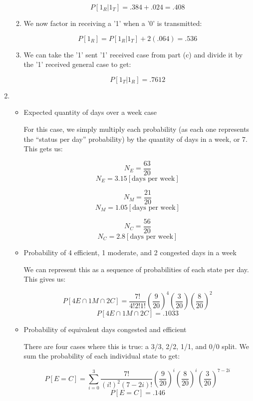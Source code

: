 \begin{enumerate}
\begin{enumerate}
        $$\boxed{P[1_R|1_T]=.384+.024=.408}$$

      \item We now factor in receiving a '1' when a '0' is transmitted:

        $$\boxed{P[1_R]=P[1_R|1_T] + 2(.064)=.536}$$

      \item We can take the '1' sent '1' received case from part (c) and divide it by the '1' received general case to get:

        $$\boxed{P[1_T|1_R]=.7612}$$

    \end{enumerate}

  \item

    \begin{itemize}

      \item Expected quantity of days over a week case

        For this case, we simply multiply each probability (as each one represents the ``status per day'' probability) by the quantity of days in a week, or 7. This gets us:

        $$N_E=\frac{63}{20}$$
        $$\boxed{N_E=3.15[\text{days per week}]}$$

        $$N_M=\frac{21}{20}$$
        $$\boxed{N_M=1.05[\text{days per week}]}$$

        $$N_C=\frac{56}{20}$$
        $$\boxed{N_C=2.8[\text{days per week}]}$$

      \item Probability of 4 efficient, 1 moderate, and 2 congested days in a week

        We can represent this as a sequence of probabilities of each state per day. This gives us:

        $$P[4E \cap 1M\cap 2C]=\frac{7!}{4!2!1!}\left( \frac{9}{20} \right)^4\left( \frac{3}{20} \right)\left( \frac{8}{20} \right)^2$$
        $$\boxed{P[4E \cap 1M\cap 2C]=.1033}$$

      \item Probability of equivalent days congested and efficient

        There are four cases where this is true: a 3/3, 2/2, 1/1, and 0/0 split. We sum the probability of each individual state to get:

        $$P[E=C]=\sum_{i=0}^3\frac{7!}{(i!)^2(7-2i)!}\left(  \frac{9}{20}\right)^i\left( \frac{8}{20} \right)^i\left( \frac{3}{20} \right)^{7-2i}$$
        $$\boxed{P[E=C]=.146}$$

    \end{itemize}

\end{enumerate}



